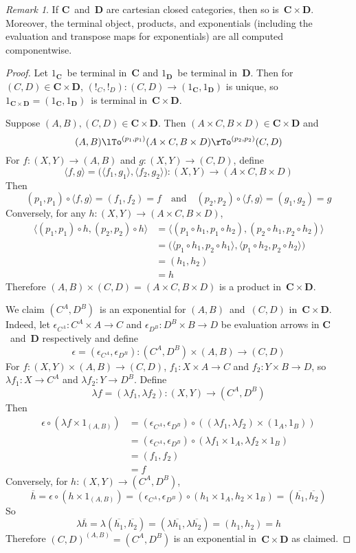 \documentclass[letterpaper,12pt]{article}
\newcommand{\after}{\circ}
\newcommand{\eval}{\epsilon}
\newcommand{\term}{{!}}
\newcommand{\pair}[2]{\langle{#1},{#2}\rangle}
\newcommand{\cat}[1]{\mathbf{#1}}
\newcommand{\curry}[1]{\lambda{#1}}
\newcommand{\uncurry}[1]{\overline{#1}}
\newcommand{\2}{\cat{2}}
\newcommand{\C}{\cat{C}}
\newcommand{\D}{\cat{D}}
\theoremstyle{definition}
\theoremstyle{remark}
\newtheorem*{rmk}{Remark}
\theoremstyle{direction}
\begin{document}
\begin{rmk}
If \(\C\)~and~\(\D\) are cartesian closed categories, then so is~\(\C\times\D\). Moreover, the terminal object, products, and exponentials (including the evaluation and transpose maps for exponentials) are all computed componentwise.
\end{rmk}
\begin{proof}
Let \(1_{\C}\)~be terminal in~\(\C\) and \(1_{\D}\)~be terminal in~\(\D\). Then for \((C,D)\in\C\times\D\), \((\term_C,\term_D):(C,D)\to(1_{\C},1_{\D})\) is unique, so \(1_{\C\times\D}=(1_{\C},1_{\D})\)~is terminal in~\(\C\times\D\).

Suppose \((A,B),(C,D)\in\C\times\D\). Then \((A\times C,B\times D)\in\C\times\D\) and
\[(A,B)\lTo^{(p_1,p_1)}(A\times C,B\times D)\rTo^{(p_2,p_2)}(C,D)\]
For \(f:(X,Y)\to(A,B)\) and \(g:(X,Y)\to(C,D)\), define
\[\pair{f}{g}=\bigl(\pair{f_1}{g_1},\pair{f_2}{g_2}\bigr):(X,Y)\to(A\times C,B\times D)\]
Then
\[(p_1,p_1)\after\pair{f}{g}=(f_1,f_2)=f\quad\text{and}\quad(p_2,p_2)\after\pair{f}{g}=(g_1,g_2)=g\]
Conversely, for any \(h:(X,Y)\to(A\times C,B\times D)\),
\begin{align*}
\pair{(p_1,p_1)\after h}{(p_2,p_2)\after h}&=\pair{(p_1\after h_1,p_1\after h_2)}{(p_2\after h_1,p_2\after h_2)}\\
	&=\bigl(\pair{p_1\after h_1}{p_2\after h_1},\pair{p_1\after h_2}{p_2\after h_2}\bigr)\\
	&=(h_1,h_2)\\
	&=h
\end{align*}
Therefore \((A,B)\times(C,D)=(A\times C,B\times D)\) is a product in~\(\C\times\D\).

We claim \((C^A,D^B)\)~is an exponential for \((A,B)\)~and~\((C,D)\) in~\(\C\times\D\). Indeed, let \(\eval_{C^A}:C^A\times A\to C\) and \(\eval_{D^B}:D^B\times B\to D\) be evaluation arrows in \(\C\)~and~\(\D\) respectively and define
\[\eval=(\eval_{C^A},\eval_{D^B}):(C^A,D^B)\times(A,B)\to(C,D)\]
For \(f:(X,Y)\times(A,B)\to(C,D)\), \(f_1:X\times A\to C\) and \(f_2:Y\times B\to D\), so \(\curry{f_1}:X\to C^A\) and \(\curry{f_2}:Y\to D^B\). Define
\[\curry{f}=(\curry{f_1},\curry{f_2}):(X,Y)\to(C^A,D^B)\]
Then
\begin{align*}
\eval\after(\curry{f}\times 1_{(A,B)})&=(\eval_{C^A},\eval_{D^B})\after((\curry{f_1},\curry{f_2})\times(1_A,1_B))\\
	&=(\eval_{C^A},\eval_{D^B})\after(\curry{f_1}\times1_A,\curry{f_2}\times1_B)\\
	&=(f_1,f_2)\\
	&=f
\end{align*}
Conversely, for \(h:(X,Y)\to(C^A,D^B)\),
\[\uncurry{h}=\eval\after(h\times1_{(A,B)})=(\eval_{C^A},\eval_{D^B})\after(h_1\times1_A,h_2\times1_B)=(\uncurry{h_1},\uncurry{h_2})\]
So
\[\curry{\uncurry{h}}=\curry{(\uncurry{h_1},\uncurry{h_2})}=(\curry{\uncurry{h_1}},\curry{\uncurry{h_2}})=(h_1,h_2)=h\]
Therefore \((C,D)^{(A,B)}=(C^A,D^B)\) is an exponential in~\(\C\times\D\) as claimed.
\end{proof}
\end{document}

